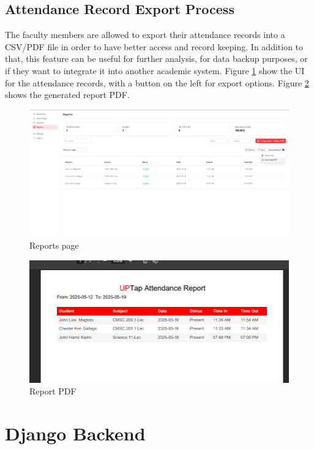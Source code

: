 \subsection{Attendance Record Export Process}
The faculty members are allowed to export their attendance records into a CSV/PDF file in order to have better access and record keeping. In addition to that, this feature can be useful for further analysis, for data backup purposes, or if they want to integrate it into another academic system. Figure \ref{fig:att_ui} show the UI for the attendance records, with a button on the left for export options. Figure \ref{fig:att_report} shows the generated report PDF.
\begin{figure}[h] %
	\centering
	\includegraphics[width=1.0\textwidth]{figures/chapter4/att_ui.png} %
	\caption{Reports page}
	\label{fig:att_ui}
\end{figure}
\begin{figure}[h] %
	\centering
	\includegraphics[width=1.0\textwidth]{figures/chapter4/att_report.png} %
	\caption{Report PDF}
	\label{fig:att_report}
\end{figure}
\clearpage
\section{Django Backend}
